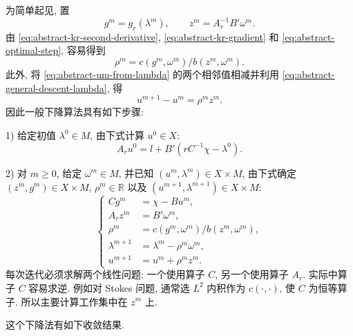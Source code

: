 为简单起见, 置
\[
g^m=g_r(\lambda^m),
\qquad
z^m=A_r^{-1}B'\omega^m.
\]
由 
\eqref{eq:abstract-kr-second-derivative},
\eqref{eq:abstract-kr-gradient} 和
\eqref{eq:abstract-optimal-step}, 容易得到
\[
\rho^m=c(g^m,\omega^m)/b(z^m,\omega^m).
\]
此外, 将 
\eqref{eq:abstract-um-from-lambda} 的两个相邻值相减并利用
\eqref{eq:abstract-general-descent-lambda}, 得
\[
u^{m+1}-u^m=\rho^mz^m.
\]
因此一般下降算法具有如下步骤:

1) 给定初值 $\lambda^0\in M$, 由下式计算 $u^0\in X$:
\[
A_ru^0=l+B'(rC^{-1}\chi-\lambda^0).
\]

2) 对 $m\ge0$, 给定 $\omega^m\in M$, 并已知
$(u^m,\lambda^m)\in X\times M$, 由下式确定
$(z^m,g^m)\in X\times M$, $\rho^m\in\mathbb R$ 以及
$(u^{m+1},\lambda^{m+1})\in X\times M$:
\begin{equation}\label{eq:abstract-general-descent-system}
\left\{
\begin{aligned}
Cg^m&=\chi-Bu^m,\\
A_rz^m&=B'\omega^m,\\
\rho^m&=c(g^m,\omega^m)/b(z^m,\omega^m),\\
\lambda^{m+1}&=\lambda^m-\rho^m\omega^m,\\
u^{m+1}&=u^m+\rho^mz^m.
\end{aligned}
\right.
\end{equation}
每次迭代必须求解两个线性问题: 一个使用算子 $C$, 另一个使用算子 $A_r$.
实际中算子 $C$ 容易求逆. 例如对 Stokes 问题, 通常选
$L^2$ 内积作为 $c(\cdot,\cdot)$, 使 $C$ 为恒等算子.
所以主要计算工作集中在 $z^m$ 上.

这个下降法有如下收敛结果.

